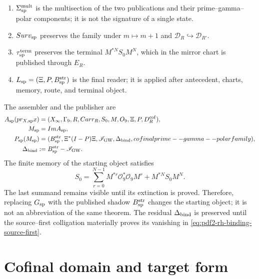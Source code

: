 \begin{enumerate}
 regulator for all channels.
 \item \(\Sigma_{\rm sp}^{\rm mult}\) is the multisection of the two
 publications and their prime--gamma--polar components; it is not the signature of a
 single state.
 \item \(\operatorname{Surv}_{\rm sp}\) preserves the family under
 \(m\mapsto m+1\) and \(\mathcal D_R\hookrightarrow\mathcal D_{R'}\).
 \item \(\tau_{\rm sp}^{\rm term}\) preserves the terminal
 \(M^{*N}S_0M^N\), which in the mirror chart is published through \(E_R\).
    \item \(\mathcal L_{\rm sp}=(\Xi,P,B_{\rm sp}^{\rm str})\) is the final reader; it is applied
 after antecedent, charts, memory, route, and terminal object.
\end{enumerate}

The assembler and the publisher are
\begin{equation}\label{eq:pdf2-rh-ensamblador-sp}
\begin{aligned}
 \mathcal A_{\rm sp}(\operatorname{pr}_{X,{\rm sp}}\widehat x)
  ={}&(\widehat X_\infty,\Gamma_9,\widehat R,
      \operatorname{Carr}_R,S_0,M,\mathcal O_9,
      \Xi,P,\mathcal D_R^{\rm cof}),\\
 \mathfrak M_{\rm sp}={}&\operatorname{Im}\mathcal A_{\rm sp},\\
 \mathcal P_{\rm sp}(\mathfrak M_{\rm sp})
  ={}&(B_{\rm sp}^{\rm str},\Xi^*(I-P)\Xi,
       \mathscr I_{\rm GW},\Delta_{\rm bind},
       \text{cofinal prime--gamma--polar family}),\\
 \Delta_{\rm bind}:={}&B_{\rm sp}^{\rm str}-\mathscr I_{\rm GW}.
\end{aligned}
\end{equation}
The finite memory of the starting object satisfies
\begin{equation}\label{eq:pdf2-rh-stein-finito}
 S_0=\sum_{r=0}^{N-1}M^{*r}\mathcal O_9^*\mathcal O_9M^r
     +M^{*N}S_0M^N.
\end{equation}
The last summand remains visible until its extinction is proved.
Therefore, replacing \(\mathfrak G_{\rm sp}\) with the published shadow
\(B_{\rm sp}^{\rm str}\) changes the starting object; it is not an abbreviation
of the same theorem. The residual \(\Delta_{\rm bind}\) is preserved until the
source--first colligation materially proves its vanishing in
\eqref{eq:pdf2-rh-binding-source-first}.

\section{Cofinal domain and target form}

